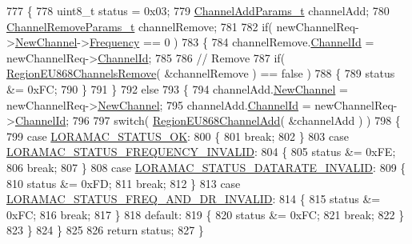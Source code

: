 \begin{DoxyCode}
777 \{
778     uint8\_t status = 0x03;
779     \mbox{\hyperlink{structs_channel_add_params}{ChannelAddParams\_t}} channelAdd;
780     \mbox{\hyperlink{structs_channel_remove_params}{ChannelRemoveParams\_t}} channelRemove;
781 
782     \textcolor{keywordflow}{if}( newChannelReq->\mbox{\hyperlink{structs_new_channel_req_params_afc31493a105479490228fd896b20b45c}{NewChannel}}->\mbox{\hyperlink{structs_channel_params_ade3d190636488dad9a89b19446b7acf1}{Frequency}} == 0 )
783     \{
784         channelRemove.\mbox{\hyperlink{structs_channel_remove_params_ae23f953dc29c360e56a3c856404a3276}{ChannelId}} = newChannelReq->\mbox{\hyperlink{structs_new_channel_req_params_ab072d8ed1ab01d956d5b86a9d0185c3f}{ChannelId}};
785 
786         \textcolor{comment}{// Remove}
787         \textcolor{keywordflow}{if}( \mbox{\hyperlink{group___r_e_g_i_o_n_e_u868_gac30e0032ee1e6f09d4ee032e7169e238}{RegionEU868ChannelsRemove}}( &channelRemove ) == \textcolor{keyword}{false} )
788         \{
789             status &= 0xFC;
790         \}
791     \}
792     \textcolor{keywordflow}{else}
793     \{
794         channelAdd.\mbox{\hyperlink{structs_channel_add_params_afc31493a105479490228fd896b20b45c}{NewChannel}} = newChannelReq->\mbox{\hyperlink{structs_new_channel_req_params_afc31493a105479490228fd896b20b45c}{NewChannel}};
795         channelAdd.\mbox{\hyperlink{structs_channel_add_params_ae23f953dc29c360e56a3c856404a3276}{ChannelId}} = newChannelReq->\mbox{\hyperlink{structs_new_channel_req_params_ab072d8ed1ab01d956d5b86a9d0185c3f}{ChannelId}};
796 
797         \textcolor{keywordflow}{switch}( \mbox{\hyperlink{group___r_e_g_i_o_n_e_u868_gaa51182eab8774612408fd0ea8f89f63b}{RegionEU868ChannelAdd}}( &channelAdd ) )
798         \{
799             \textcolor{keywordflow}{case} \mbox{\hyperlink{group___l_o_r_a_m_a_c_gga1d18f26b344040b3ec5c3db662919661a03db5fca052313edb3823c014b653a74}{LORAMAC\_STATUS\_OK}}:
800             \{
801                 \textcolor{keywordflow}{break};
802             \}
803             \textcolor{keywordflow}{case} \mbox{\hyperlink{group___l_o_r_a_m_a_c_gga1d18f26b344040b3ec5c3db662919661ae3ea7b89796aed5a320013d9743b2955}{LORAMAC\_STATUS\_FREQUENCY\_INVALID}}:
804             \{
805                 status &= 0xFE;
806                 \textcolor{keywordflow}{break};
807             \}
808             \textcolor{keywordflow}{case} \mbox{\hyperlink{group___l_o_r_a_m_a_c_gga1d18f26b344040b3ec5c3db662919661aa910e51ef7a7cf64c27dd3ffe5eb9d38}{LORAMAC\_STATUS\_DATARATE\_INVALID}}:
809             \{
810                 status &= 0xFD;
811                 \textcolor{keywordflow}{break};
812             \}
813             \textcolor{keywordflow}{case} \mbox{\hyperlink{group___l_o_r_a_m_a_c_gga1d18f26b344040b3ec5c3db662919661a163a1a739baee13607068af42f2e9d30}{LORAMAC\_STATUS\_FREQ\_AND\_DR\_INVALID}}:
814             \{
815                 status &= 0xFC;
816                 \textcolor{keywordflow}{break};
817             \}
818             \textcolor{keywordflow}{default}:
819             \{
820                 status &= 0xFC;
821                 \textcolor{keywordflow}{break};
822             \}
823         \}
824     \}
825 
826     \textcolor{keywordflow}{return} status;
827 \}
\end{DoxyCode}

